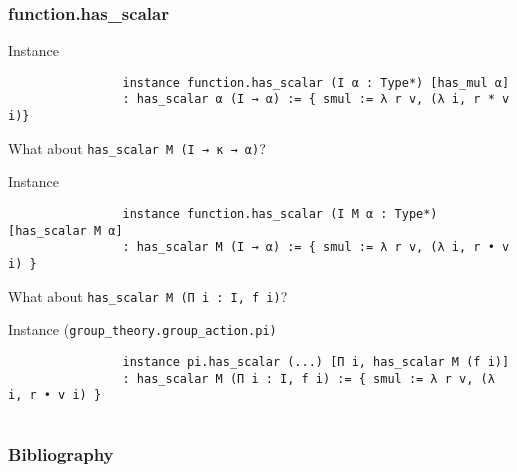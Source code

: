 \documentclass{beamer}
\begin{document}
	\begin{frame}[t, fragile]
	\frametitle{function.has\_scalar}
		\begin{block}{Instance}
			\begin{lstlisting}
				instance function.has_scalar (I α : Type*) [has_mul α]
				: has_scalar α (I → α) := { smul := λ r v, (λ i, r * v i)}
			\end{lstlisting}
		\end{block}
		\pause
		What about \lstinline{has_scalar M (I → κ → α)}?
		\pause
		\begin{block}{Instance}
			\begin{lstlisting}
				instance function.has_scalar (I M α : Type*) [has_scalar M α]
				: has_scalar M (I → α) := { smul := λ r v, (λ i, r • v i) }
			\end{lstlisting}
		\end{block}
		\pause
		What about \lstinline{has_scalar M (Π i : I, f i)}?
		\pause
		\begin{block}{Instance (\texttt{group\_theory.group\_action.pi)}}
			\begin{lstlisting}
				instance pi.has_scalar (...) [Π i, has_scalar M (f i)]
				: has_scalar M (Π i : I, f i) := { smul := λ r v, (λ i, r • v i) }
			\end{lstlisting}
		\end{block}
	\end{frame}

	\section{}
	\renewcommand{\section}[2]{}
	\begin{frame}[t]
	\frametitle{Bibliography}
		\printbibliography
	\end{frame}
\end{document}
